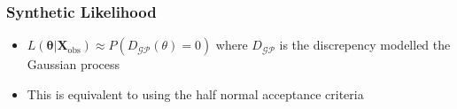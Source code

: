\documentclass{beamer}
\begin{document}
\begin{frame}
    \frametitle{Synthetic Likelihood}
    \begin{itemize}
        \item $L(\bm\theta | \mathbf{X}_\text{obs}) \approx P(D_{\mathcal{GP}}(\theta) = 0)$ where $D_{\mathcal{GP}}$ is the discrepency modelled the Gaussian process
        \item This is equivalent to using the half normal acceptance criteria
              \begin{figure}
                  \centering
              \end{figure}
    \end{itemize}
\end{frame}
\end{document}
